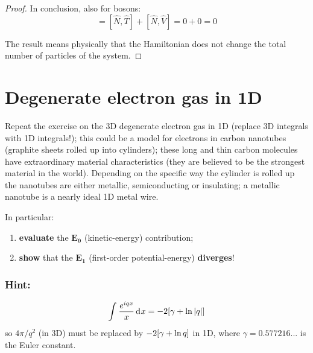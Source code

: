 \documentclass[11pt, a4paper, twoside, openright]{article}
\begin{document}
\begin{proof}
In conclusion, also for bosons:
\begin{equation*}
  [\hat{N}, \hat{H}  ] = [\hat{N}, \hat{T}  ] + [\hat{N}, \hat{V}  ] = 0 + 0 = 0
\end{equation*}

The result means physically that the Hamiltonian does not change the total number of particles of the system.


\end{proof}















\clearpage
\section{Degenerate electron gas in \( \pmb{1} \)D}

Repeat the exercise on the 3D degenerate electron gas in 1D (replace 3D integrals with 1D integrals!); this could be a model for electrons in carbon nanotubes (graphite sheets rolled up into cylinders); these long and thin carbon molecules have extraordinary material characteristics (they are believed to be the strongest material in the world). Depending on the specific way the cylinder is rolled up the nanotubes are either metallic, semiconducting or insulating; a metallic nanotube is a nearly ideal 1D metal wire.

In particular:
\begin{enumerate}
\item  \textbf{evaluate} the \( \pmb{E_0} \) (kinetic-energy) contribution;
\item  \textbf{show}  that the \( \pmb{E_1} \) (first-order potential-energy) \textbf{diverges}!
\end{enumerate}

\subsubsection*{Hint:}
\begin{equation}
  \int_{}^{} \frac{e^{iqx} }{x} \dd[]{x} = - 2 \qty[ \gamma + \ln{\abs{q} }  ]
  \label{eq:hint}
\end{equation}
so \( 4 \pi /q^2 \) (in 3D) must be replaced by \( - 2 \qty[ \gamma + \ln{q}  ] \) in 1D, where \( \gamma =  0.577216... \) is the Euler constant.
\end{document}
